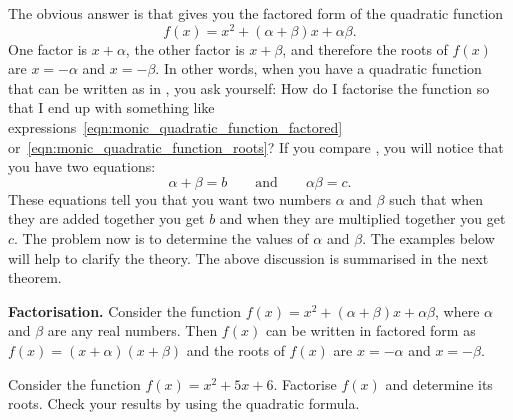 \documentclass[a4paper,oneside,12pt]{article}
\begin{document}
The obvious answer is that
 gives you the
factored form of the quadratic function
\begin{equation}
\label{eqn:monic_quadratic_function_roots}
f(x)
=
x^2 + (\alpha + \beta)x + \alpha\beta.
\end{equation}
One factor is $x + \alpha$, the other factor is $x + \beta$, and
therefore the roots of $f(x)$ are $x = -\alpha$ and $x = -\beta$.  In
other words, when you have a quadratic function that can be written as
in , you ask yourself: How do
I factorise the function so that I end up with something like
expressions~\eqref{eqn:monic_quadratic_function_factored}
or~\eqref{eqn:monic_quadratic_function_roots}?  If you compare
,
you will notice that you have two equations:
\begin{equation}
\label{eqn:monic_quadratic_function_factors_sum_product}
\alpha + \beta
=
b
\qquad
\text{and}
\qquad
\alpha\beta
=
c.
\end{equation}
These equations tell you that you want two numbers $\alpha$ and
$\beta$ such that when they are added together you get $b$ and when
they are multiplied together you get $c$.  The problem now is to
determine the values of $\alpha$ and $\beta$.  The examples below will
help to clarify the theory.  The above discussion is summarised in the
next theorem.

\begin{theorem}
\textbf{Factorisation.}
Consider the function $f(x) = x^2 + (\alpha + \beta)x + \alpha\beta$,
where $\alpha$ and $\beta$ are any real numbers.  Then $f(x)$ can be
written in factored form as $f(x) = (x + \alpha) (x + \beta)$ and the
roots of $f(x)$ are $x = -\alpha$ and $x = -\beta$.
\end{theorem}

\begin{example}
\label{eg:factorise_monic_a1_b2_c6}
Consider the function $f(x) = x^2 + 5x + 6$.  Factorise $f(x)$ and
determine its roots.  Check your results by using the quadratic
formula.
\end{example}
\end{document}
